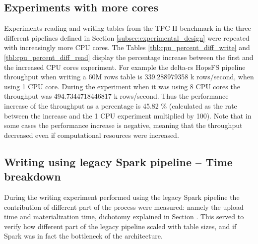 \subsection{Experiments with more  cores}

Experiments reading and writing tables from the TPC-H benchmark in the three different pipelines defined in Section \ref{subsec:experimental_design} were repeated with increasingly more \gls{CPU} cores. The Tables \ref{tbl:cpu_percent_diff_write} and \ref{tbl:cpu_percent_diff_read} display the percentage increase between the first and the increased \gls{CPU} cores experiment. For example the delta-rs \gls{HopsFS} pipeline throughput when writing a 60M rows table is 339.288979358 k rows/second, when using 1 \gls{CPU} core. During the experiment when it was using 8 \gls{CPU} cores the throughput was 494.7344718446817 k rows/second. Thus the performance increase of the throughput as a percentage is 45.82 \% (calculated as the rate between the increase and the 1 \gls{CPU} experiment multiplied by 100). Note that in some cases the performance increase is negative, meaning that the throughput decreased even if computational resources were increased.

\subsection{Writing using legacy Spark pipeline -- Time breakdown}

During the writing experiment performed using the legacy Spark pipeline the contribution of different part of the process were measured: namely the upload time and materialization time, dichotomy explained in Section . This served to verify how different part of the legacy pipeline scaled with table sizes, and if Spark was in fact the bottleneck of the architecture.

